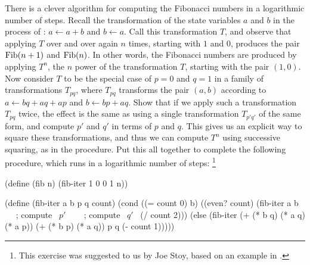 \begin{exercise}
	\label{Exercise 1.19}
	There is a clever algorithm for computing the Fibonacci numbers in a logarithmic number of steps.
	Recall the transformation of the state variables \( a \) and \( b \) in the  process of :
	\( a \gets a + b \) and \( b \gets a \).
	Call this transformation \( T \), and observe that applying \( T \) over and over again \( n \) times, starting with \( 1 \) and \( 0 \), produces the pair \( \operatorname{Fib} (n + 1) \) and \( \operatorname{Fib}(n) \).
	In other words, the Fibonacci numbers are produced by applying \( T^n \), the \( n \) power of the transformation \( T \), starting with the pair \( (1, 0) \).
	Now consider \( T \) to be the special case of \( p = 0 \) and \( q = 1 \) in a family of transformations \( T_{pq} \), where \( T_{pq} \) transforms the pair \( (a, b) \) according to \( a \gets bq + aq + ap \) and \( b \gets bp + aq \).
	Show that if we apply such a transformation \( T_{pq} \) twice, the effect is the same as using a single transformation \( T_{p' q'} \) of the same form, and compute \( p'\) and \( q' \) in terms of \( p \) and \( q \).
	This gives us an explicit way to square these transformations, and thus we can compute \( T^n \) using successive squaring, as in the  procedure.
	Put this all together to complete the following procedure, which runs in a logarithmic number of steps:%
	\footnote{
		This exercise was suggested to us by Joe Stoy, based on an example in .
	}
	\begin{scheme}
	  (define (fib n)
	    (fib-iter 1 0 0 1 n))

	  (define (fib-iter a b p q count)
	    (cond ((= count 0) b)
	          ((even? count)
	           (fib-iter a
	                     b
	                     ~~   ; compute ~\( p' \)~
	                     ~~   ; compute ~\( q' \)~
	                     (/ count 2)))
	          (else (fib-iter (+ (* b q) (* a q) (* a p))
	                          (+ (* b p) (* a q))
	                          p
	                          q
	                          (- count 1)))))
	\end{scheme}
\end{exercise}

